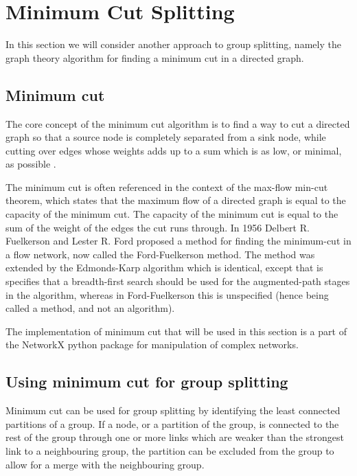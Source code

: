 \section{Minimum Cut Splitting}
In this section we will consider another approach to group splitting, namely the graph theory algorithm for finding a minimum cut in a directed graph. 

\subsection{Minimum cut}
The core concept of the minimum cut algorithm is to find a way to cut a directed graph so that a source node is completely separated from a sink node, while cutting over edges 
whose weights adds up to a sum which is as low, or minimal, as possible \cite{chinneck}.

The minimum cut is often referenced in the context of the max-flow min-cut theorem, which states that the maximum flow of a directed graph is equal to the capacity of the minimum cut.
The capacity of the minimum cut is equal to the sum of the weight of the edges the cut runs through. In 1956 Delbert R. Fuelkerson and Lester R.
Ford proposed a method for finding the minimum-cut \cite{ford1956} in a flow network, now called the Ford-Fuelkerson method. The method was extended by the Edmonds-Karp algorithm \cite{Edmonds} which is identical, except that is specifies that a breadth-first search should be used for the augmented-path stages in the algorithm, whereas in Ford-Fuelkerson this is unspecified (hence being called
a method, and not an algorithm).

The implementation of minimum cut that will be used in this section is a part of the NetworkX \cite{NetworkX} python package for manipulation of complex networks.

\subsection{Using minimum cut for group splitting}
Minimum cut can be used for group splitting by identifying the least connected partitions of a group. If a node, or a partition of the group, is connected to the rest of the group
through one or more links which are weaker than the strongest link to a neighbouring group, the partition can be excluded from the group to allow for a merge with the neighbouring group. 



